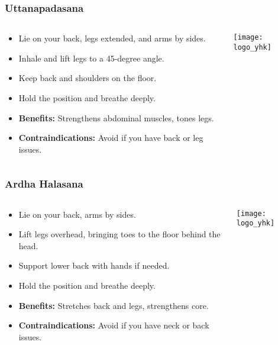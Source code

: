 \begin{frame}[fragile]\frametitle{Uttanapadasana}
\begin{columns}
    \begin{column}[T]{0.5\linewidth}
      \begin{itemize}
        \item Lie on your back, legs extended, and arms by sides.
        \item Inhale and lift legs to a 45-degree angle.
        \item Keep back and shoulders on the floor.
        \item Hold the position and breathe deeply.
        \item \textbf{Benefits:} Strengthens abdominal muscles, tones legs.
        \item \textbf{Contraindications:} Avoid if you have back or leg issues.
      \end{itemize}
    \end{column}
    \begin{column}[T]{0.5\linewidth}
        \begin{center}
        \texttt{[image: logo\_yhk]}
        \end{center}    
    \end{column}
  \end{columns}
\end{frame}

\begin{frame}[fragile]\frametitle{Ardha Halasana}
\begin{columns}
    \begin{column}[T]{0.5\linewidth}
      \begin{itemize}
        \item Lie on your back, arms by sides.
        \item Lift legs overhead, bringing toes to the floor behind the head.
        \item Support lower back with hands if needed.
        \item Hold the position and breathe deeply.
        \item \textbf{Benefits:} Stretches back and legs, strengthens core.
        \item \textbf{Contraindications:} Avoid if you have neck or back issues.
      \end{itemize}
    \end{column}
    \begin{column}[T]{0.5\linewidth}
        \begin{center}
        \texttt{[image: logo\_yhk]}
        \end{center}    
    \end{column}
  \end{columns}
\end{frame}

